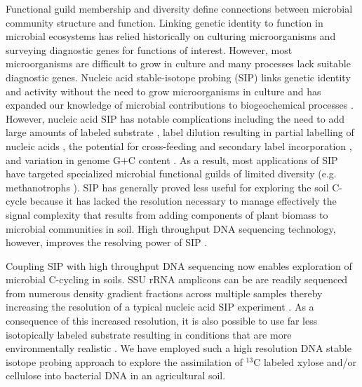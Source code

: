 Functional guild membership and diversity define connections between microbial
community structure and function. Linking genetic identity to function in
microbial ecosystems has relied historically on culturing microorganisms and
surveying diagnostic genes for functions of interest. However, most
microorganisms are difficult to grow in culture \citep{Janssen2006} 
and many processes lack suitable diagnostic genes. Nucleic acid stable-isotope
probing (SIP) links genetic identity and activity without the need to grow
microorganisms in culture and has expanded our knowledge of microbial
contributions to biogeochemical processes \citep{Chen_Murrell_2010}. However,
nucleic acid SIP has notable complications including the need to add large
amounts of labeled substrate \citep{radajewski2000stable}, label dilution
resulting in partial labelling of nucleic acids
\citep{radajewski2000stable,Manefield_2002,McDonald_2005}, the potential for
cross-feeding and secondary label incorporation
\citep{Morris_2002,Hutchens2004,14686943,DeRito2005,McDonald_2005,Ziegler_2005},
and variation in genome G$+$C content
\citep{Buckley_2007,9780408708036,Holben1995,Nusslein1999}. As a result, most
applications of SIP have targeted specialized microbial functional guilds of
limited diversity (e.g. methanotrophs \citep{radajewski2000stable}). SIP has
generally proved less useful for exploring the soil C-cycle because it has
lacked the resolution necessary to manage effectively the signal complexity
that results from adding components of plant biomass to microbial communities
in soil. High throughput DNA sequencing technology, however, improves the
resolving power of SIP \citep{Aoyagi2015}. 

Coupling SIP with high throughput DNA sequencing now enables exploration of
microbial C-cycling in soils. SSU rRNA amplicons can be are readily sequenced
from numerous density gradient fractions across multiple samples thereby
increasing the resolution of a typical nucleic acid SIP experiment
\citep{Verastegui_2014}. As a consequence of this increased resolution, it is
also possible to use far less isotopically labeled substrate resulting in
conditions that are more environmentally realistic \citep{Aoyagi2015}. We have
employed such a high resolution DNA stable isotope probing approach to explore
the assimilation of $^{13}$C labeled xylose and/or cellulose into bacterial DNA
in an agricultural soil. 


